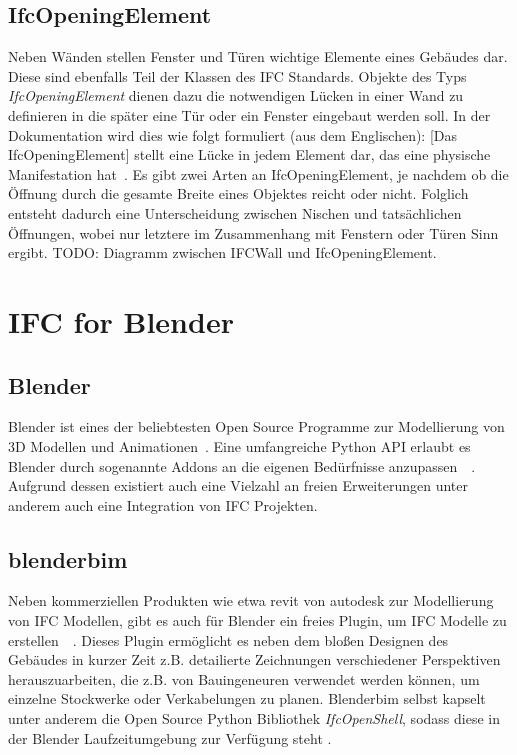 \subsection{IfcOpeningElement}
\label{basics:IfcOpeningElement}
Neben Wänden stellen Fenster und Türen wichtige Elemente eines Gebäudes dar.
Diese sind ebenfalls Teil der Klassen des IFC Standards.
Objekte des Typs \textit{IfcOpeningElement} dienen dazu die notwendigen Lücken in einer Wand zu definieren in die später eine Tür oder ein Fenster eingebaut werden soll.
In der Dokumentation wird dies wie folgt formuliert (aus dem Englischen): \glqq{}[Das IfcOpeningElement] stellt eine Lücke in jedem Element dar, das eine physische Manifestation hat\grqq{}~\cite{IFC4310OpeningElement:online}.
Es gibt zwei Arten an IfcOpeningElement, je nachdem ob die Öffnung durch die gesamte Breite eines Objektes reicht oder nicht. 
Folglich entsteht dadurch eine Unterscheidung zwischen Nischen und tatsächlichen Öffnungen, wobei nur letztere im Zusammenhang mit Fenstern oder Türen Sinn ergibt.
TODO: Diagramm zwischen IFCWall und IfcOpeningElement.

\section{IFC for Blender}\label{basics:blender}
\subsection{Blender}
Blender ist eines der beliebtesten Open Source Programme zur Modellierung von 3D Modellen und Animationen~\cite{blendero56:online}.
Eine umfangreiche Python API erlaubt es Blender durch sogenannte Addons an die eigenen Bedürfnisse anzupassen~\cite{PythonWebsite:online}~\cite{BlenderPythonAPI:online}.
Aufgrund dessen existiert auch eine Vielzahl an freien Erweiterungen \textendash{} unter anderem auch eine Integration von IFC Projekten.

\subsection{blenderbim}
Neben kommerziellen Produkten wie etwa revit von autodesk zur Modellierung von IFC Modellen, gibt es auch für Blender ein freies Plugin, um IFC Modelle zu erstellen~\cite{RevitSof26:online}~\cite{BlenderB43:online}.
Dieses Plugin ermöglicht es neben dem bloßen Designen des Gebäudes in kurzer Zeit z.B. detailierte Zeichnungen verschiedener Perspektiven herauszuarbeiten, die z.B. von Bauingeneuren verwendet werden können, um einzelne Stockwerke oder Verkabelungen zu planen.
Blenderbim selbst kapselt unter anderem die Open Source Python Bibliothek \textit{IfcOpenShell}, sodass diese in der Blender Laufzeitumgebung zur Verfügung steht \cite{IFCOpenShell:online}.

